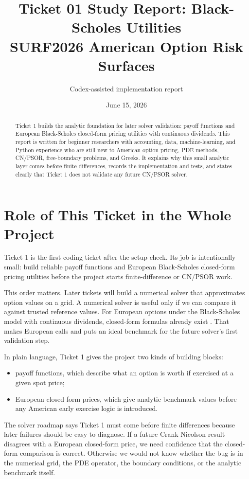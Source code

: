 \documentclass[11pt,a4paper]{article}
\title{\textbf{Ticket 01 Study Report: Black-Scholes Utilities}\\
\large SURF2026 American Option Risk Surfaces}
\author{Codex-assisted implementation report}
\date{June 15, 2026}
\begin{document}
\maketitle

\begin{abstract}
Ticket 1 builds the analytic foundation for later solver validation: payoff functions and
European Black-Scholes closed-form pricing utilities with continuous dividends. This report is
written for beginner researchers with accounting, data, machine-learning, and Python experience
who are still new to American option pricing, PDE methods, CN/PSOR, free-boundary problems, and
Greeks. It explains why this small analytic layer comes before finite differences, records the
implementation and tests, and states clearly that Ticket 1 does not validate any future CN/PSOR
solver.
\end{abstract}

\tableofcontents
\newpage

\section{Role of This Ticket in the Whole Project}

Ticket 1 is the first coding ticket after the setup check. Its job is intentionally small: build
reliable payoff functions and European Black-Scholes closed-form pricing utilities before the
project starts finite-difference or CN/PSOR work.

This order matters. Later tickets will build a numerical solver that approximates option values on
a grid. A numerical solver is useful only if we can compare it against trusted reference values.
For European options under the Black-Scholes model with continuous dividends, closed-form formulas
already exist \citep{black_scholes_1973,merton_1973}. That makes European calls and puts an
ideal benchmark for the future solver's first validation step.

In plain language, Ticket 1 gives the project two kinds of building blocks:
\begin{itemize}
  \item payoff functions, which describe what an option is worth if exercised at a given spot price;
  \item European closed-form prices, which give analytic benchmark values before any American early
        exercise logic is introduced.
\end{itemize}

The solver roadmap says Ticket 1 must come before finite differences because later failures should
be easy to diagnose. If a future Crank-Nicolson result disagrees with a European closed-form price,
we need confidence that the closed-form comparison is correct. Otherwise we would not know whether
the bug is in the numerical grid, the PDE operator, the boundary conditions, or the analytic
benchmark itself.
\end{document}
